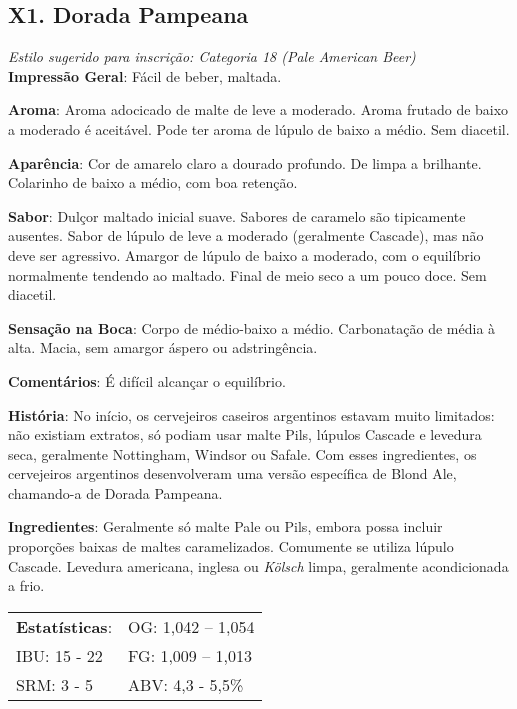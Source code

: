 \subsection*{X1. Dorada Pampeana}

\textit{Estilo sugerido para inscrição: Categoria 18 (Pale American Beer)}\\
\textbf{Impressão Geral}: Fácil de beber, maltada.

\textbf{Aroma}: Aroma adocicado de malte de leve a moderado. Aroma frutado de baixo a moderado é aceitável. Pode ter aroma de lúpulo de baixo a médio. Sem diacetil.

\textbf{Aparência}: Cor de amarelo claro a dourado profundo. De limpa a brilhante. Colarinho de baixo a médio, com boa retenção.

\textbf{Sabor}: Dulçor maltado inicial suave. Sabores de caramelo são tipicamente ausentes. Sabor de lúpulo de leve a moderado (geralmente Cascade), mas não deve ser agressivo. Amargor de lúpulo de baixo a moderado, com o equilíbrio normalmente tendendo ao maltado. Final de meio seco a um pouco doce. Sem diacetil.

\textbf{Sensação na Boca}: Corpo de médio-baixo a médio. Carbonatação de média à alta. Macia, sem amargor áspero ou adstringência.

\textbf{Comentários}: É difícil alcançar o equilíbrio.

\textbf{História}: No início, os cervejeiros caseiros argentinos estavam muito limitados: não existiam extratos, só podiam usar malte Pils, lúpulos Cascade e levedura seca, geralmente Nottingham, Windsor ou Safale. Com esses ingredientes, os cervejeiros argentinos desenvolveram uma versão específica de Blond Ale, chamando-a de Dorada Pampeana.

\textbf{Ingredientes}: Geralmente só malte Pale ou Pils, embora possa incluir proporções baixas de maltes caramelizados. Comumente se utiliza lúpulo Cascade. Levedura americana, inglesa ou \textit{Kölsch} limpa, geralmente acondicionada a frio.

\begin{tabular}{@{}p{35mm}p{35mm}@{}}
  \textbf{Estatísticas}: & OG: 1,042 – 1,054 \\
  IBU: 15 - 22 & FG: 1,009 – 1,013 \\
  SRM: 3 - 5 & ABV: 4,3 - 5,5\%
\end{tabular}